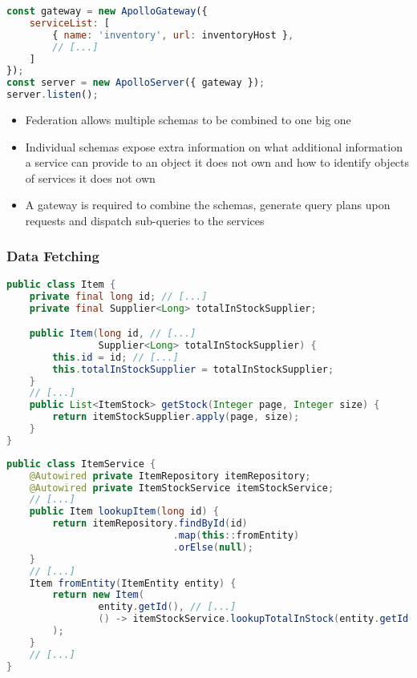 \begin{lstlisting}[caption={Implementation of the GraphQL Gateway}, language=javascript]
const gateway = new ApolloGateway({
    serviceList: [
        { name: 'inventory', url: inventoryHost },
        // [...]
    ]
});
const server = new ApolloServer({ gateway });
server.listen();
\end{lstlisting}

\begin{itemize}
    \item Federation allows multiple schemas to be combined to one big one
    \item Individual schemas expose extra information on what additional information a service can provide to an object it does not own and how to identify objects of services it does not own
    \item A gateway is required to combine the schemas, generate query plans upon requests and dispatch sub-queries to the services
\end{itemize}

\subsubsection{Data Fetching}

\begin{lstlisting}[caption={Data Fetching in \acs{API} Models}, language=java]
public class Item {
    private final long id; // [...]
    private final Supplier<Long> totalInStockSupplier;

    public Item(long id, // [...]
                Supplier<Long> totalInStockSupplier) {
        this.id = id; // [...]
        this.totalInStockSupplier = totalInStockSupplier;
    }
    // [...]
    public List<ItemStock> getStock(Integer page, Integer size) {
        return itemStockSupplier.apply(page, size);
    }
}
\end{lstlisting}

\begin{lstlisting}[caption={\acs{API} Model Creation with Fetcher Injection}, language=java]
public class ItemService {
    @Autowired private ItemRepository itemRepository;
    @Autowired private ItemStockService itemStockService;
    // [...]
    public Item lookupItem(long id) {
        return itemRepository.findById(id)
                             .map(this::fromEntity)
                             .orElse(null);
    }
    // [...]
    Item fromEntity(ItemEntity entity) {
        return new Item(
                entity.getId(), // [...]
                () -> itemStockService.lookupTotalInStock(entity.getId())
        );
    }
    // [...]
}
\end{lstlisting}

